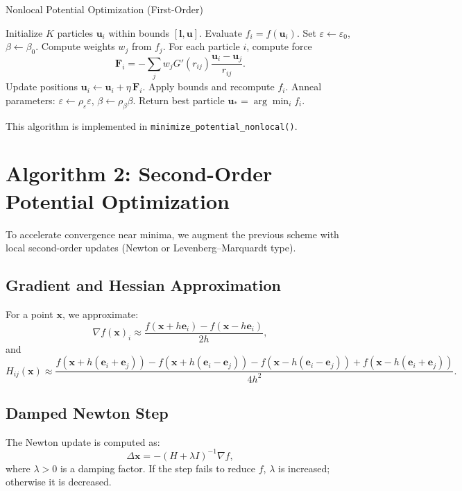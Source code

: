\documentclass[12pt]{article}
\begin{document}
\begin{algorithm}[h!]
\caption{Nonlocal Potential Optimization (First-Order)}
\begin{algorithmic}[1]
\STATE Initialize $K$ particles $\mathbf{u}_i$ within bounds $[\mathbf{l}, \mathbf{u}]$.
\STATE Evaluate $f_i = f(\mathbf{u}_i)$.
\STATE Set $\varepsilon \leftarrow \varepsilon_0$, $\beta \leftarrow \beta_0$.
    \STATE Compute weights $w_j$ from $f_j$.
    \STATE For each particle $i$, compute force
    \[
        \mathbf{F}_i = -\sum_j w_j G'(r_{ij}) \frac{\mathbf{u}_i - \mathbf{u}_j}{r_{ij}}.
    \]
    \STATE Update positions $\mathbf{u}_i \leftarrow \mathbf{u}_i + \eta \, \mathbf{F}_i$.
    \STATE Apply bounds and recompute $f_i$.
    \STATE Anneal parameters:
    $\varepsilon \leftarrow \rho_\varepsilon \varepsilon$, \quad $\beta \leftarrow \rho_\beta \beta$.
\ENDFOR
\STATE Return best particle $\mathbf{u}_\ast = \arg\min_i f_i$.
\end{algorithmic}
\end{algorithm}

This algorithm is implemented in \texttt{minimize\_potential\_nonlocal()}.

\section{Algorithm 2: Second-Order Potential Optimization}

To accelerate convergence near minima, we augment the previous scheme with local second-order updates (Newton or Levenberg–Marquardt type).

\subsection{Gradient and Hessian Approximation}

For a point $\mathbf{x}$, we approximate:
\[
\nabla f(\mathbf{x})_i \approx \frac{f(\mathbf{x}+h\mathbf{e}_i) - f(\mathbf{x}-h\mathbf{e}_i)}{2h},
\]
and
\[
H_{ij}(\mathbf{x}) \approx \frac{f(\mathbf{x}+h(\mathbf{e}_i+\mathbf{e}_j)) - f(\mathbf{x}+h(\mathbf{e}_i-\mathbf{e}_j)) - f(\mathbf{x}-h(\mathbf{e}_i-\mathbf{e}_j)) + f(\mathbf{x}-h(\mathbf{e}_i+\mathbf{e}_j))}{4h^2}.
\]

\subsection{Damped Newton Step}

The Newton update is computed as:
\[
\Delta \mathbf{x} = - (H + \lambda I)^{-1} \nabla f,
\]
where $\lambda > 0$ is a damping factor.  
If the step fails to reduce $f$, $\lambda$ is increased; otherwise it is decreased.
\end{document}
